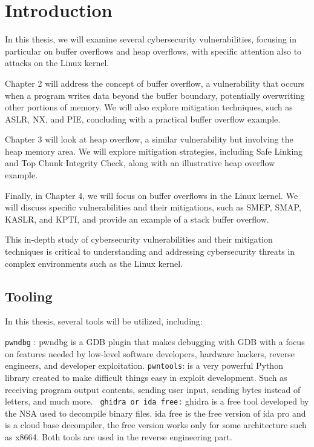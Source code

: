 \chapter{Introduction}
In this thesis, we will examine several cybersecurity vulnerabilities, focusing in particular on buffer overflows and heap overflows, with specific attention also to attacks on the Linux kernel.\newline

Chapter 2 will address the concept of buffer overflow, a vulnerability that occurs when a program writes data beyond the buffer boundary, potentially overwriting other portions of memory. We will also explore mitigation techniques, such as ASLR, NX, and PIE, concluding with a practical buffer overflow example.\newline

Chapter 3 will look at heap overflow, a similar vulnerability but involving the heap memory area. We will explore mitigation strategies, including Safe Linking and Top Chunk Integrity Check, along with an illustrative heap overflow example.\newline

Finally, in Chapter 4, we will focus on buffer overflows in the Linux kernel. We will discuss specific vulnerabilities and their mitigations, such as SMEP, SMAP, KASLR, and KPTI, and provide an example of a stack buffer overflow.\newline

This in-depth study of cybersecurity vulnerabilities and their mitigation techniques is critical to understanding and addressing cybersecurity threats in complex environments such as the Linux kernel.\newline

\section{Tooling}
In this thesis, several tools will be utilized, including:\newline


\texttt{pwndbg} : pwndbg is a GDB plugin that makes debugging with GDB with a focus on features needed by low-level software developers, hardware hackers, reverse engineers, and developer exploitation.\newline
    \texttt{pwntools}: is a very powerful Python library created to make difficult things easy in exploit development.\newline
    Such as receiving program output contents, sending user input, sending bytes instead of letters, and much more.\newline
    \texttt{ ghidra or ida free:} 
    ghidra is a free tool developed by the NSA used to decompile binary files.
    ida free is the free version of ida pro and is a cloud base decompiler, the free version works only for some architecture such as x8664.\newline
    Both tools are used in the reverse engineering part.\newline
